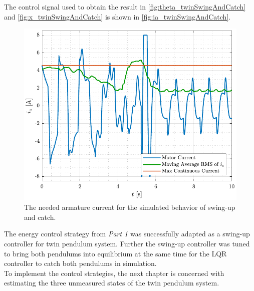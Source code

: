 %
The control signal used to obtain the result in \autoref{fig:theta_twinSwingAndCatch} and \ref{fig:x_twinSwingAndCatch} is shown in \autoref{fig:ia_twinSwingAndCatch}.
%
\begin{figure}[H]
  \includegraphics[width=.5\textwidth]{figures/ia_twinSwingAndCatch}
  \caption{The needed armature current for the simulated behavior of swing-up and catch.}
  \label{fig:ia_twinSwingAndCatch}
\end{figure}
%
%
%
%
%
%
%
The energy control strategy from \textit{Part 1} was successfully adapted as a swing-up controller for twin pendulum system. Further the swing-up controller was tuned to bring both pendulums into equilibrium at the same time for the LQR controller to catch both pendulums in simulation.\\
To implement the control strategies, the next chapter is concerned with estimating the three unmeasured states of the twin pendulum system.
